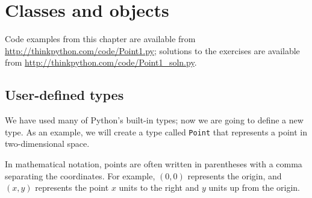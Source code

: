 \documentclass[10pt]{book}
\begin{document}







\chapter{Classes and objects}

Code examples from this chapter are available from
\url{http://thinkpython.com/code/Point1.py}; solutions
to the exercises are available from
\url{http://thinkpython.com/code/Point1_soln.py}.


\section{User-defined types}
\label{point}

We have used many of Python's built-in types; now we are going
to define a new type.  As an example, we will create a type
called {\tt Point} that represents a point in two-dimensional
space.

In mathematical notation, points are often written in
parentheses with a comma separating the coordinates. For example,
$(0,0)$ represents the origin, and $(x,y)$ represents the
point $x$ units to the right and $y$ units up from the origin.
\end{document}
